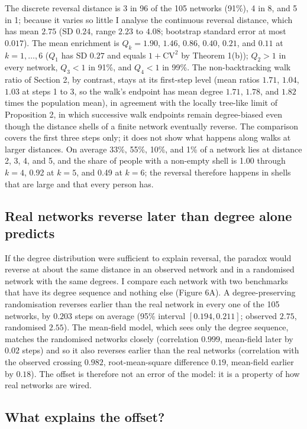 \documentclass{nws}
\begin{document}
The discrete reversal distance is 3 in 96 of the 105 networks (91\%), 4 in 8, and 5
in 1; because it varies so little I analyse the continuous reversal distance, which
has mean $2.75$ (SD $0.24$, range $2.23$ to $4.08$; bootstrap standard error at most
$0.017$). The mean enrichment is $Q_k=1.90$, $1.46$, $0.86$, $0.40$, $0.21$, and $0.11$ at $k=1,\ldots,6$ ($Q_1$ has SD $0.27$ and equals $1+\mathrm{CV}^2$ by Theorem 1(b)); $Q_2>1$ in every network, $Q_3<1$ in 91\%, and $Q_4<1$ in 99\%. The non-backtracking walk ratio of Section 2, by contrast, stays at its first-step level (mean ratios $1.71$, $1.04$, $1.03$ at steps 1 to 3, so the walk's endpoint has mean degree $1.71$, $1.78$, and $1.82$ times the population mean), in agreement with the locally tree-like limit of Proposition 2, in which successive walk endpoints remain degree-biased even though the distance shells of a finite network eventually reverse. The comparison covers the first three steps only; it does not show what happens along walks at larger distances. On average 33\%, 55\%, 10\%, and 1\% of a network lies at distance 2, 3, 4,
and 5, and the share of people with a non-empty shell is 1.00 through $k=4$, 0.92 at
$k=5$, and 0.49 at $k=6$; the reversal therefore happens in shells that are large and
that every person has.

\subsection{Real networks reverse later than degree alone predicts}

If the degree distribution were sufficient to explain reversal, the paradox would reverse at about the same distance in an observed network and in a randomised network with the same degrees. I compare each network with two benchmarks that have its degree sequence and nothing
else (Figure 6A). A degree-preserving randomisation reverses earlier than the real
network in every one of the 105 networks, by $0.203$ steps on average (95\% interval
$[0.194,0.211]$; observed $2.75$, randomised $2.55$). The mean-field model, which
sees only the degree sequence, matches the randomised networks closely (correlation
$0.999$, mean-field later by $0.02$ steps) and so it also reverses earlier than the real
networks (correlation with the observed crossing $0.982$, root-mean-square
difference $0.19$, mean-field earlier by $0.18$). The offset is therefore not an error
of the model: it is a property of how real networks are wired.

\subsection{What explains the offset?}
\end{document}
